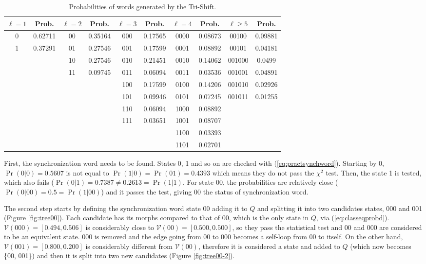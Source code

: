{\begin{table}
\centering
\caption{Probabilities of words generated by the Tri-Shift. \label{tab:trishiftsub}}
\begin{tabular}{|c|c|c|c|c|c|c|c|c|c|}
\hline
$\ell = 1$ & Prob. & $\ell = 2$ & Prob. & $\ell = 3$ & Prob. & $\ell = 4$ & Prob. & $\ell \geq 5$ & Prob.\\
\hline
0 & 0.62711 & 00 & 0.35164 & 000 & 0.17565 & 0000 & 0.08673 & 00100 & 0.09881\\
1 & 0.37291 & 01 & 0.27546 & 001 & 0.17599 & 0001 & 0.08892 & 00101 & 0.04181\\
  &      & 10 & 0.27546 & 010 & 0.21451 & 0010 & 0.14062 & 001000 & 0.0499\\
  &      & 11 & 0.09745 & 011 & 0.06094 & 0011 & 0.03536 & 001001 & 0.04891\\
  &	     &    &      & 100 & 0.17599 & 0100 & 0.14206 & 001010 & 0.02926\\
  &      &    &      & 101 & 0.09946 & 0101 & 0.07245 & 001011 & 0.01255\\
  &      &    &      & 110 & 0.06094 & 1000 & 0.08892 &        &     \\
  &      &    &      & 111 & 0.03651 & 1001 & 0.08707 &        &     \\
  &      &    &      &     &      & 1100 & 0.03393 &        &     \\
  &      &    &      &     &      & 1101 & 0.02701 &        &     \\
\hline
\end{tabular}
\end{table}

First, the synchronization word needs to be found. States 0, 1 and so on are checked with (\ref{eq:practsynchword}). Starting by 0, $\Pr(0|0) = 0.5607$ is not equal to $\Pr(1|0) = \Pr(01)= 0.4393$ which means they do not pass the $\chi^2$ test. Then, the state 1 is tested, which also fails ($\Pr(0|1) = 0.7387 \neq 0.2613 = \Pr(1|1)$. For state 00, the probabilities are relatively close ($\Pr(0|00) = 0.5 = \Pr(1|00)$) and it passes the test, giving 00 the status of synchronization word.

The second step starts by defining the synchronization word state 00 adding it to $Q$ and splitting it into two candidates states, 000 and 001 (Figure \ref{fig:tree00}). Each candidate has its morphs compared to that of 00, which is the only state in $Q$, via (\ref{eq:classeqprobd}). $\mathcal{V}(000) = [0.494, 0.506]$ is considerably close to $\mathcal{V}(00) = [0.500, 0.500]$, so they pass the statistical test and 00 and 000 are considered to be an equivalent state. 000 is removed and the edge going from 00 to 000 becomes a self-loop from 00 to itself. On the other hand, $\mathcal{V}(001) = [0.800, 0.200]$ is considerably different from $\mathcal{V}(00)$, therefore it is considered a state and added to $Q$ (which now becomes \{00, 001\}) and then it is split into two new candidates (Figure \ref{fig:tree00-2}).

}
